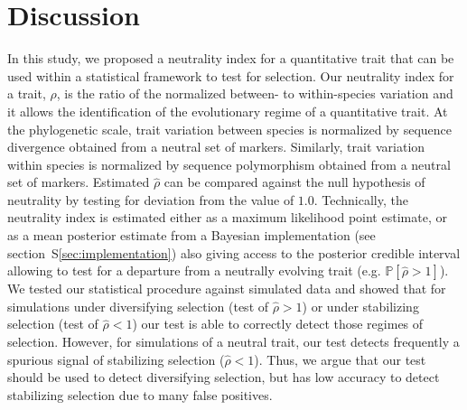 \documentclass{article}
\newcommand{\proba}{\mathbb{P}}
\newcommand{\NI}{\rho}
\newcommand{\EstNI}{\widehat{\rho}}
\begin{document}
\section*{Discussion}\label{sec:discussion}

In this study, we proposed a neutrality index for a quantitative trait that can be used within a statistical framework to test for selection.
Our neutrality index for a trait, $\NI$, is the ratio of the normalized between- to within-species variation and it allows the identification of the evolutionary regime of a quantitative trait.
At the phylogenetic scale, trait variation between species is normalized by sequence divergence obtained from a neutral set of markers.
Similarly, trait variation within species is normalized by sequence polymorphism obtained from a neutral set of markers.
Estimated $\EstNI$ can be compared against the null hypothesis of neutrality by testing for deviation from the value of $1.0$.
Technically, the neutrality index is estimated either as a maximum likelihood point estimate, or as a mean posterior estimate from a Bayesian implementation (see section~S\ref{sec:implementation}) also giving access to the posterior credible interval allowing to test for a departure from a neutrally evolving trait (e.g. $ \proba [ \EstNI > 1 ]$).
We tested our statistical procedure against simulated data and showed that for simulations under diversifying selection (test of $\EstNI > 1$) or under stabilizing selection (test of $\EstNI < 1$) our test is able to correctly detect those regimes of selection.
However, for simulations of a neutral trait, our test detects frequently a spurious signal of stabilizing selection ($\EstNI < 1$).
Thus, we argue that our test should be used to detect diversifying selection, but has low accuracy to detect stabilizing selection due to many false positives.
\end{document}
